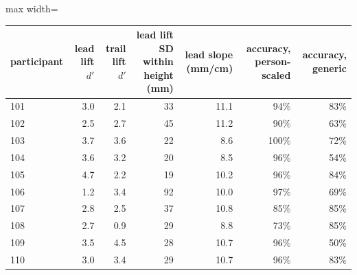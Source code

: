 \begin{adjustbox}{max width=\textwidth}
{\footnotesize
\begin{tabular}{lrrrrrr}
\toprule
\textbf{participant} & \textbf{lead lift $d'$} & \textbf{trail lift $d'$} & \textbf{lead lift SD within height (mm)} & \textbf{lead slope (mm/cm)} & \textbf{accuracy, person-scaled} & \textbf{accuracy, generic} \\
\midrule
101 & 3.0 & 2.1 & 33 & 11.1 & 94\% & 83\% \\
102 & 2.5 & 2.7 & 45 & 11.2 & 90\% & 63\% \\
103 & 3.7 & 3.6 & 22 & 8.6 & 100\% & 72\% \\
104 & 3.6 & 3.2 & 20 & 8.5 & 96\% & 54\% \\
105 & 4.7 & 2.2 & 19 & 10.2 & 96\% & 84\% \\
106 & 1.2 & 3.4 & 92 & 10.0 & 97\% & 69\% \\
107 & 2.8 & 2.5 & 37 & 10.8 & 85\% & 85\% \\
108 & 2.7 & 0.9 & 29 & 8.8 & 73\% & 85\% \\
109 & 3.5 & 4.5 & 28 & 10.7 & 96\% & 50\% \\
110 & 3.0 & 3.4 & 29 & 10.7 & 96\% & 83\% \\
\bottomrule
\end{tabular}
}
\end{adjustbox}
